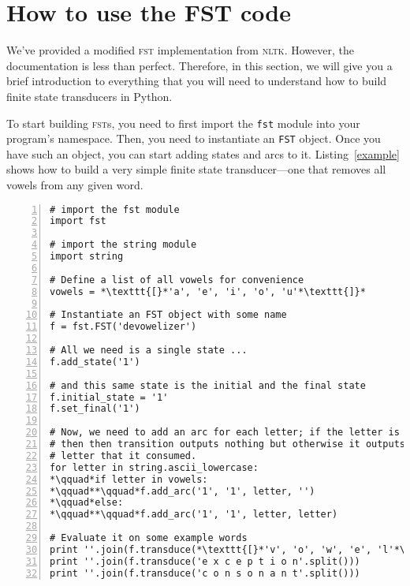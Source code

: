 \documentclass[11pt,letterpaper]{article}
\begin{document}
\newpage
\section*{How to use the FST code}

We've provided a modified \textsc{fst} implementation from \textsc{nltk}.
However, the documentation is less than perfect. Therefore, in this
section, we will give you a brief introduction to everything that you
will need to understand how to build finite state transducers in Python.

To start building \textsc{fst}s, you need to first import the
\texttt{fst} module into your program's namespace. Then, you need to
instantiate an \texttt{FST} object. Once you have such an object, you
can start adding states and arcs to it. Listing~\ref{example} shows
how to build a very simple finite state transducer---one that removes
all vowels from any given word.

\begin{lstlisting}[float, label=example,caption=A 1-state transducer that deletes vowels, frame=trBL,escapechar=*, numbers=left, numberstyle=\tiny, numberblanklines=false]
# import the fst module
import fst

# import the string module
import string

# Define a list of all vowels for convenience
vowels = *\texttt{[}*'a', 'e', 'i', 'o', 'u'*\texttt{]}*

# Instantiate an FST object with some name
f = fst.FST('devowelizer')

# All we need is a single state ...
f.add_state('1')

# and this same state is the initial and the final state
f.initial_state = '1'
f.set_final('1')

# Now, we need to add an arc for each letter; if the letter is a vowel
# then then transition outputs nothing but otherwise it outputs the same
# letter that it consumed.
for letter in string.ascii_lowercase:
*\qquad*if letter in vowels:
*\qquad**\qquad*f.add_arc('1', '1', letter, '')
*\qquad*else:
*\qquad**\qquad*f.add_arc('1', '1', letter, letter)

# Evaluate it on some example words
print ''.join(f.transduce(*\texttt{[}*'v', 'o', 'w', 'e', 'l'*\texttt{]}*))
print ''.join(f.transduce('e x c e p t i o n'.split()))
print ''.join(f.transduce('c o n s o n a n t'.split()))

\end{lstlisting}
\end{document}
